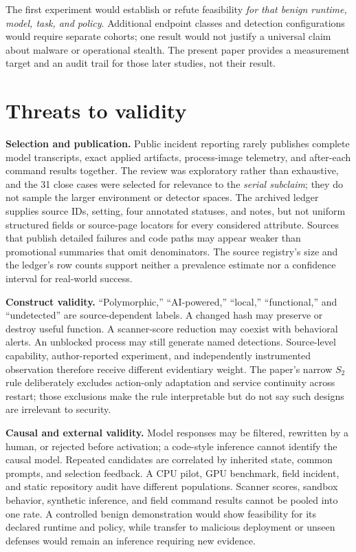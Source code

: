 \documentclass[11pt,letterpaper]{article}
\begin{document}
The first experiment would establish or refute feasibility \emph{for that benign runtime, model, task, and policy}. Additional endpoint classes and detection configurations would require separate cohorts; one result would not justify a universal claim about malware or operational stealth. The present paper provides a measurement target and an audit trail for those later studies, not their result.

\section{Threats to validity}\label{sec:limits}

\textbf{Selection and publication.} Public incident reporting rarely publishes complete model transcripts, exact applied artifacts, process-image telemetry, and after-each command results together. The review was exploratory rather than exhaustive, and the 31 close cases were selected for relevance to the \emph{serial subclaim}; they do not sample the larger environment or detector spaces. The archived ledger supplies source IDs, setting, four annotated statuses, and notes, but not uniform structured fields or source-page locators for every considered attribute. Sources that publish detailed failures and code paths may appear weaker than promotional summaries that omit denominators. The source registry's size and the ledger's row counts support neither a prevalence estimate nor a confidence interval for real-world success.

\textbf{Construct validity.} ``Polymorphic,'' ``AI-powered,'' ``local,'' ``functional,'' and ``undetected'' are source-dependent labels. A changed hash may preserve or destroy useful function. A scanner-score reduction may coexist with behavioral alerts. An unblocked process may still generate named detections. Source-level capability, author-reported experiment, and independently instrumented observation therefore receive different evidentiary weight. The paper's narrow $S_2$ rule deliberately excludes action-only adaptation and service continuity across restart; those exclusions make the rule interpretable but do not say such designs are irrelevant to security.

\textbf{Causal and external validity.} Model responses may be filtered, rewritten by a human, or rejected before activation; a code-style inference cannot identify the causal model. Repeated candidates are correlated by inherited state, common prompts, and selection feedback. A CPU pilot, GPU benchmark, field incident, and static repository audit have different populations. Scanner scores, sandbox behavior, synthetic inference, and field command results cannot be pooled into one rate. A controlled benign demonstration would show feasibility for its declared runtime and policy, while transfer to malicious deployment or unseen defenses would remain an inference requiring new evidence.
\end{document}
